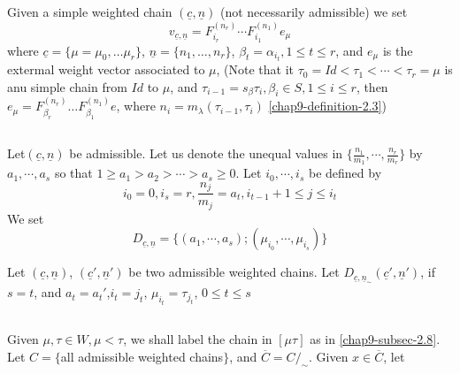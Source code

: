 \subsection{}\label{chap9-subsec-3.9}
Given a simple weighted chain $(\underline{c}, \underline{n})$ (not necessarily admissible) we set
$$
v_{\underline{c},\underline{n}} = F_{i_{r}}^{(n_{r})}\cdots F_{i_{1}}^{(n_{1})}e_{\mu}
$$
where $\underline{c} = \{\mu = \mu_{0},\ldots \mu_{r}\}$, $\underline{n} = \{n_{1}, \ldots, n_{r}\}$, $\beta_{t} = \alpha_{i_{t}}, 1 \leq t \leq r$, and $e_{\mu}$ is the extermal weight vector associated to $\mu$, (Note that it $\tau_{0} = Id < \tau_{1} < \cdots < \tau_{r} = \mu$ is anu simple chain from $Id$ to $\mu$, and $\tau_{i-1}= s_{\beta}\tau_{i}, \beta_{i} \in S, 1 \leq i \leq r$, then $e_{\mu} =F_{\beta_{r}}^{(n_{r})}\ldots F_{\beta_{1}}^{(n_{1})}e$, where $n_{i}=m_{\lambda}(\tau_{i-1}, \tau_{i})$ \eqref{chap9-definition-2.3})

\subsection{}\label{chap9-subsec-3.10}
Let\pageoriginale $(\underline{c}, \underline{n})$ be admissible. Let us denote the unequal values in $\{ \frac{n_{1}}{m_{1}}, \cdots, \frac{n_{r}}{m_{r}}\}$ by $a_{1}, \cdots, a_{s}$ so that $1\geq a_{1} > a_{2}> \cdots > a_{s} \geq 0$. Let $i_{0}, \cdots, i_{s}$ be defined by
$$
i_{0}=0, i_{s}=r, \dfrac{n_{j}}{m_{j}} =a_{t}, i_{t-1}+1 \leq j \leq i_{t}
$$
We set
$$
D_{\underline{c}, \underline{n}} = \{(a_{1}, \cdots, a_{s}); (\mu_{i_{0}}, \cdots, \mu_{i_{s}})\}
$$

\setcounter{definition}{10}
\begin{definition}\label{chap9-definition-3.11}
Let $(\underline{c}, \underline{n})$, $(\underline{c}', \underline{n}')$ be two admissible weighted chains. Let $D_{\underline{c}, \underline{n}_{\sim}}(\underline{c}', \underline{n}')$, if $s=t$, and $a_{t}= a_{t}'$,$i_{t}=j_{t}$, $\mu_{i_{t}} = \tau_{j_{t}}$, $0 \leq t \leq s$
\end{definition}

\setcounter{subsection}{11}
\subsection{}\label{chap9-subsec-3.12}
Given $\mu, \tau \in W, \mu < \tau$, we shall label the chain in $[\mu \tau]$ as in \ref{chap9-subsec-2.8}.
Let $C=\{$all admissible weighted chains$\}$, and $\overline{C}=C/_{\sim}$. Given $x \in \overline{C}$, let


